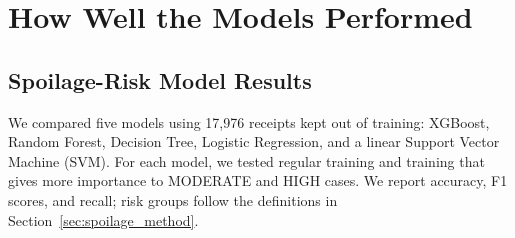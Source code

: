 \documentclass[12pt,a4paper]{article}
\renewcommand{\_}{\oldunderscore\allowbreak}
\begin{document}
\section{How Well the Models Performed}

\subsection{Spoilage-Risk Model Results}
\label{sec:spoilage_results}

We compared five models using 17,976 receipts kept out of training: XGBoost, Random Forest, Decision Tree, Logistic Regression, and a linear Support Vector Machine (SVM). For each model, we tested regular training and training that gives more importance to MODERATE and HIGH cases. We report accuracy, F1 scores, and recall; risk groups follow the definitions in Section~\ref{sec:spoilage_method}.
\end{document}
